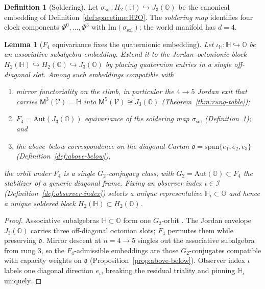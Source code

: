 \documentclass[aps,prd,onecolumn,amsmath,amssymb,nofootinbib,11pt]{revtex4-2}
\numberwithin{equation}{section}
\theoremstyle{plain}
\newtheorem{lemma}[theorem]{Lemma}
\theoremstyle{definition}
\newtheorem{definition}[theorem]{Definition}
\theoremstyle{remark}
\newcommand{\Quat}{\mathbb{H}}
\newcommand{\Oct}{\mathbb{O}}
\newcommand{\jalg}{J_3(\mathbb{O})}
\newcommand{\Void}{\mathcal{V}}
\newcommand{\Mirror}{\mathsf{M}}
\newcommand{\orderparam}{\Phi}
\begin{document}
\begin{definition}[Soldering]\label{def:soldering}
Let $\sigma_{\mathrm{sol}}:H_2(\Quat)\hookrightarrow\jalg$ be the canonical
embedding of Definition~\ref{def:spacetime:H2O}. The \emph{soldering map}
identifies four clock components $\orderparam^0,\ldots,\orderparam^3$ with
$\mathrm{Im}(\sigma_{\mathrm{sol}})$; the world manifold has $d=4$.
\end{definition}

\begin{lemma}[$F_4$ equivariance fixes the quaternionic embedding]
\label{lem:quat-F4}
Let $\iota_{\Quat}:\Quat\hookrightarrow\Oct$ be an associative subalgebra
embedding. Extend it to the Jordan--octonionic block
$H_2(\Quat)\hookrightarrow H_2(\Oct)\hookrightarrow\jalg$ by placing
quaternion entries in a single off-diagonal slot. Among such embeddings
compatible with
\begin{enumerate}[label=(\roman*),leftmargin=*]
  \item mirror functoriality on the climb, in particular the
    $4\to5$ Jordan exit that carries $\Mirror^3(\Void)=\Quat$ into
    $\Mirror^5(\Void)\cong\jalg$ (Theorem~\ref{thm:rung-table});
  \item $F_4=\mathrm{Aut}(\jalg)$ equivariance of the soldering map
    $\sigma_{\mathrm{sol}}$ (Definition~\ref{def:soldering}); and
  \item the above--below correspondence on the diagonal Cartan
    $\mathfrak{d}=\mathrm{span}\{e_1,e_2,e_3\}$
    (Definition~\ref{def:above-below}),
\end{enumerate}
the orbit under $F_4$ is a single $G_2$-conjugacy class, with
$G_2=\mathrm{Aut}(\Oct)\subset F_4$ the stabilizer of a generic
diagonal frame. Fixing an observer index $\iota\in\mathcal{I}$
(Definition~\ref{def:observer-index}) selects a unique representative
$\Quat_\iota\subset\Oct$ and hence a unique soldered block
$H_2(\Quat)\subset H_2(\Oct)$.
\end{lemma}

\begin{proof}
Associative subalgebras $\Quat\subset\Oct$ form one $G_2$-orbit
\cite{SpringerVeldkamp2000}. The Jordan envelope $\jalg$ carries three
off-diagonal octonion slots; $F_4$ permutes them while preserving
$\mathfrak{d}$. Mirror descent at $n=4\to5$ singles out the associative
subalgebra from rung $3$, so the $F_4$-admissible embeddings are those
$G_2$-conjugates compatible with capacity weights on $\mathfrak{d}$
(Proposition~\ref{prop:above-below}). Observer index $\iota$ labels one
diagonal direction $e_\iota$, breaking the residual triality and pinning
$\Quat_\iota$ uniquely.
\end{proof}
\end{document}
